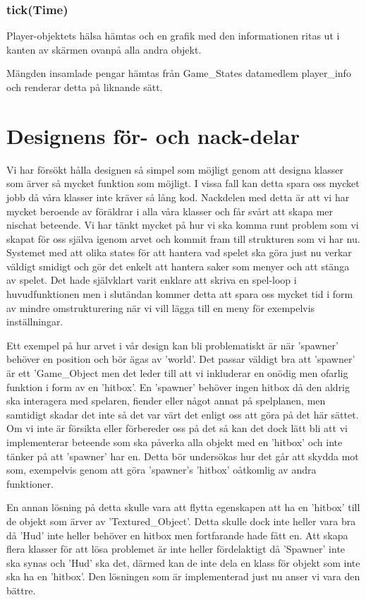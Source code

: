 \documentclass{TDP005mall}
\begin{document}
\subsubsection{tick(Time)}
Player-objektets hälsa hämtas och en grafik med den informationen ritas ut i kanten av skärmen ovanpå alla andra objekt.

Mängden insamlade pengar hämtas från Game\_States datamedlem player\_info och renderar detta på liknande sätt. 


\section{Designens för- och nack-delar}
Vi har försökt hålla designen så simpel som möjligt genom att designa klasser som ärver så mycket funktion som möjligt. I vissa fall kan detta spara oss mycket jobb då våra klasser inte kräver så lång kod. Nackdelen med detta är att vi har mycket beroende av föräldrar i alla våra klasser och får svårt att skapa mer nischat beteende. Vi har tänkt mycket på hur vi ska komma runt problem som vi skapat för oss själva igenom arvet och kommit fram till strukturen som vi har nu. Systemet med att olika states för att hantera vad spelet ska göra just nu verkar väldigt smidigt och gör det enkelt att hantera saker som menyer och att stänga av spelet. Det hade självklart varit enklare att skriva en spel-loop i huvudfunktionen men i slutändan kommer detta att spara oss mycket tid i form av mindre omstrukturering när vi vill lägga till en meny för exempelvis inställningar.

Ett exempel på hur arvet i vår design kan bli problematiskt är när 'spawner' behöver en position och bör ägas av 'world'. Det passar väldigt bra att 'spawner' är ett 'Game\_Object men det leder till att vi inkluderar en onödig men ofarlig funktion i form av en 'hitbox'. En 'spawner' behöver ingen hitbox då den aldrig ska interagera med spelaren, fiender eller något annat på spelplanen, men samtidigt skadar det inte så det var värt det enligt oss att göra på det här sättet. Om vi inte är försikta eller förbereder oss på det så kan det dock lätt bli att vi implementerar beteende som ska påverka alla objekt med en 'hitbox' och inte tänker på att 'spawner' har en. Detta bör undersökas hur det går att skydda mot som, exempelvis genom att göra 'spawner's 'hitbox' oåtkomlig av andra funktioner.

En annan lösning på detta skulle vara att flytta egenskapen att ha en 'hitbox' till de objekt som ärver av 'Textured\_Object'. Detta skulle dock inte heller vara bra då 'Hud' inte heller behöver en hitbox men fortfarande hade fått en. Att skapa flera klasser för att lösa problemet är inte heller fördelaktigt då 'Spawner' inte ska synas och 'Hud' ska det, därmed kan de inte dela en klass för objekt som inte ska ha en 'hitbox'. Den lösningen som är implementerad just nu anser vi vara den bättre.
\end{document}
